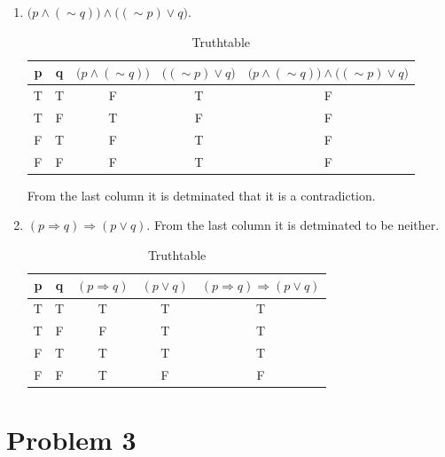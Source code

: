 \documentclass[english,10pt,a4paper]{article}
\begin{document}
\begin{enumerate}[a]
\item $\Big( p \wedge (\sim q)\Big) \wedge \Big(( \sim p) \vee q\Big) $.
\begin{table}[h]
\centering
	\begin{tabular}{c|c|c|c|c}
	\textbf{p} & \textbf{q} & \textbf{$\Big( p \wedge (\sim q)\Big)$} & \textbf{$ \Big(( \sim p) \vee q\Big) $}  & $\Big( p \wedge (\sim q)\Big) \wedge \Big(( \sim p) \vee q\Big) $\\\hline
	T & T & F & T & F\\ 	\hline
	T & F & T & F & F\\ 	\hline 
	F & T & F & T & F\\ 	\hline 
	F & F & F & T & F\\ 	\hline 
	\end{tabular}
\caption{Truthtable}
\label{tab:title}
\end{table}
From the last column it is detminated that it is a contradiction.

\item $(p \Rightarrow q) \Rightarrow (p \vee q)$. From the last column it is detminated to be neither.
\begin{table}[h]
\centering
	\begin{tabular}{c|c|c|c|c}
	\textbf{p} & \textbf{q} & $(p \Rightarrow q)$ & $(p \vee q)$ & $(p \Rightarrow q) \Rightarrow (p \vee q)$\\\hline
	T & T & T & T & T\\ 	\hline
	T & F & F & T & T\\ 	\hline 
	F & T & T & T & T\\ 	\hline 
	F & F & T & F & F\\ 	\hline 
	\end{tabular}
\caption{Truthtable}
\label{tab:title}
\end{table}

\end{enumerate}

\newpage
\section*{Problem 3}
\end{document}
